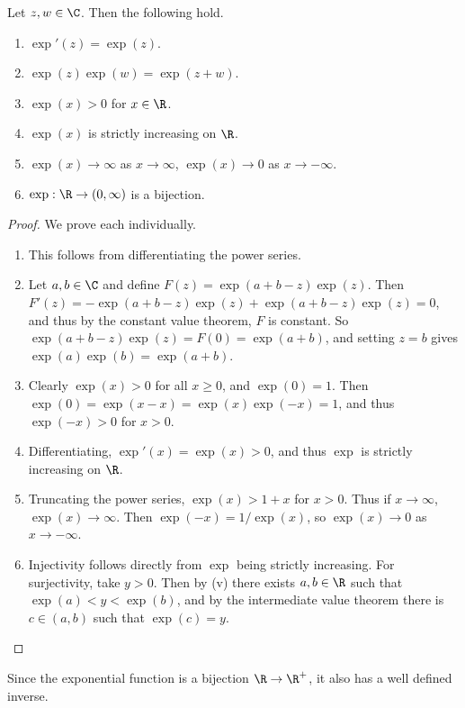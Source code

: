 \begin{proposition}\label{prop:exp}
	Let $z, w \in \C$. Then the following hold.
	\begin{enumerate}[label=(\roman*)]
		\item $\exp'(z) = \exp(z)$.
		\item $\exp(z)\exp(w) = \exp(z + w)$.
		\item $\exp(x) > 0$ for $x \in \R$.
		\item $\exp(x)$ is strictly increasing on $\R$.
		\item $\exp(x) \rightarrow \infty$ as $x \rightarrow \infty$, $\exp(x) \rightarrow 0$ as $x \rightarrow -\infty$.
		\item $\exp: \R \rightarrow (0, \infty)$ is a bijection.
	\end{enumerate}
\end{proposition}
\begin{proof}
	We prove each individually.
	\begin{enumerate}[label=(\roman*)]
		\item This follows from differentiating the power series.
		\item Let $a, b \in \C$ and define $F(z) = \exp(a + b - z)\exp(z)$. Then $F'(z) = -\exp(a + b - z)\exp(z) + \exp(a + b - z)\exp(z) = 0$, and thus by the constant value theorem, $F$ is constant. So $\exp(a + b - z)\exp(z) = F(0) = \exp(a +  b)$, and setting $z = b$ gives $\exp(a) \exp(b) = \exp(a + b)$.
		\item Clearly $\exp(x) > 0$ for all $x \geq 0$, and $\exp(0) = 1$. Then $\exp(0) = \exp(x - x) = \exp(x) \exp(-x) = 1$, and thus $\exp(-x) > 0$ for $x > 0$.
		\item Differentiating, $\exp'(x) = \exp(x) > 0$, and thus $\exp$ is strictly increasing on $\R$.
		\item Truncating the power series, $\exp(x) > 1 + x$ for $x > 0$. Thus if $x \rightarrow \infty$, $\exp(x) \rightarrow \infty$. Then $\exp(-x) = 1/\exp (x)$, so $\exp(x) \rightarrow 0$ as $x \rightarrow - \infty$.
		\item Injectivity follows directly from $\exp$ being strictly increasing. For surjectivity, take $y > 0$. Then by (v) there exists $a, b \in \R$ such that $\exp(a) < y < \exp(b)$, and by the intermediate value theorem there is $c \in (a, b)$ such that $\exp(c) = y$. \qedhere
	\end{enumerate}
\end{proof}

Since the exponential function is a bijection $\R \rightarrow \R^+$, it also has a well defined inverse.


